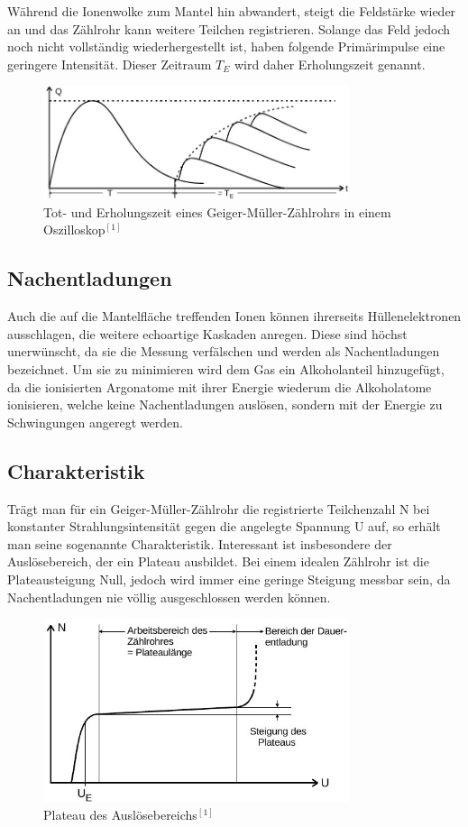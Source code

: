 Während die Ionenwolke zum Mantel hin abwandert, steigt die Feldstärke wieder an und das Zählrohr kann weitere Teilchen registrieren. Solange das Feld jedoch noch nicht vollständig wiederhergestellt ist, haben folgende Primärimpulse eine geringere Intensität. Dieser Zeitraum $T_E$ wird daher Erholungszeit genannt.
\begin{figure}[htbp]
\includegraphics[width=0.8\textwidth]{pics/erholungszeit.jpg}
\caption{Tot- und Erholungszeit eines Geiger-Müller-Zählrohrs in einem Oszilloskop$^{[1]}$}
\label{pic_totzeit}
\end{figure}

\subsection{Nachentladungen}
Auch die auf die Mantelfläche treffenden Ionen können ihrerseits Hüllenelektronen ausschlagen, die weitere echoartige Kaskaden anregen. Diese sind höchst unerwünscht, da sie die Messung verfälschen und werden als Nachentladungen bezeichnet. Um sie zu minimieren wird dem Gas ein Alkoholanteil hinzugefügt, da die ionisierten Argonatome mit ihrer Energie wiederum die Alkoholatome ionisieren, welche keine Nachentladungen auslösen, sondern mit der Energie zu Schwingungen angeregt werden.

\subsection{Charakteristik}
Trägt man für ein Geiger-Müller-Zählrohr die registrierte Teilchenzahl N bei konstanter Strahlungsintensität gegen die angelegte Spannung U auf, so erhält man seine sogenannte Charakteristik.
Interessant ist insbesondere der Auslösebereich, der ein Plateau ausbildet. Bei einem idealen Zählrohr ist die Plateausteigung Null, jedoch wird immer eine geringe Steigung messbar sein, da Nachentladungen nie völlig ausgeschlossen werden können.
\begin{figure}[htbp]
\includegraphics[width=0.8\textwidth]{pics/plateau.jpg}
\caption{Plateau des Auslösebereichs$^{[1]}$}
\end{figure}


